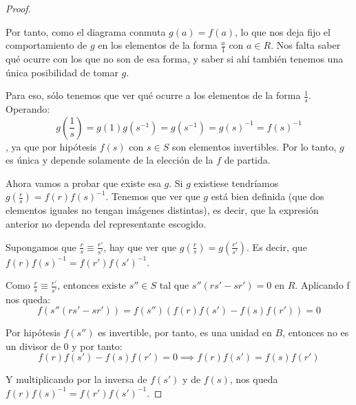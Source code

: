 \begin{proof}
\begin{center}
		\end{center}

		Por tanto, como el diagrama conmuta $g(a)=f(a)$, lo que nos deja fijo el comportamiento de $g$ en los elementos de la forma $\frac{a}{1}$ con $a ∈ R$. Nos falta saber qué ocurre con los que no son de esa forma, y saber si ahí también tenemos una única posibilidad de tomar $g$.

		Para eso, sólo tenemos que ver qué ocurre a los elementos de la forma $\frac{1}{s}$. Operando: \[ g(\frac{1}{s})=g(1)g(s^{-1})=g(s^{-1})=g(s)^{-1}=f(s)^{-1} \], ya que por hipótesis $f(s)$ con $s ∈ S$ son elementos invertibles. Por lo tanto, $g$ es única y depende solamente de la elección de la $f$ de partida.


		Ahora vamos a probar que existe esa $g$. Si $g$ existiese tendríamos $g\left( \frac{r}{s}\right)=f(r)f(s)^{-1}$. Tenemos que ver que $g$ está bien definida (que dos elementos iguales no tengan imágenes distintas), es decir, que la expresión anterior no dependa del representante escogido.

		Supongamos que $\frac{r}{s} \equiv \frac{r'}{s'}$, hay que ver que $g\left(\frac{r}{s}\right)=g\left(\frac{r'}{s'}\right)$. Es decir, que $f(r)f(s)^{-1}=f(r')f(s')^{-1}$.

		Como  $\frac{r}{s} \equiv \frac{r'}{s'}$, entonces existe $s'' \in S$ tal que $s''(rs'-sr')=0$ en $R$. Aplicando f nos queda:
		$$f(s''(rs'-sr'))=f(s'')\left( f(r)f(s')-f(s)f(r') \right)=0$$

		Por hipótesis $f(s'')$ es invertible, por tanto, es una unidad en $B$, entonces no es un divisor de 0 y por tanto:
		$$f(r)f(s')-f(s)f(r')=0 \implies f(r)f(s')=f(s)f(r')$$

		Y multiplicando por la inversa de $f(s')$ y de $f(s)$, nos queda $f(r)f(s)^{-1}=f(r')f(s')^{-1}$.
	\end{proof}


